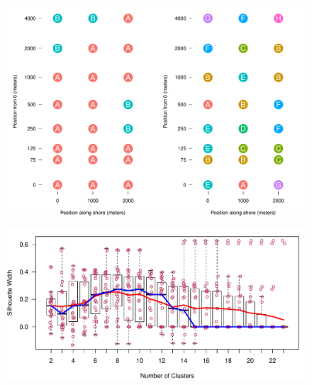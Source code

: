 \documentclass[11pt,letterpaper]{article} %
\begin{document}
\begin{figure}[H] %
  \centering
    \includegraphics[width=1\textwidth]{pam_in_space.pdf}
    \caption{\protect}
  \label{pam_in_space}
\end{figure}


\begin{figure}[H] %
  \centering
    \includegraphics[width=1\textwidth]{pam_sil.pdf}
    \caption{\protect}
  \label{pam_sil}
\end{figure}
\end{document}
